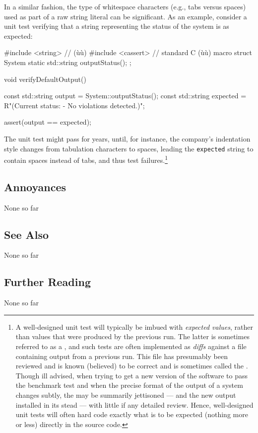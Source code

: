 In a similar fashion, the type of whitespace characters (e.g., tabs
versus spaces) used as part of a raw string literal can be significant.
As an example, consider a unit test verifying that a string representing
the status of the system is as expected:

\begin{emcppshiddenlisting}[emcppsbatch=e5]
#include <string>   // (ù{}ù)
#include <cassert>  // standard C (ù{}ù) macro
struct System
{
    static std::string outputStatus();
};
\end{emcppshiddenlisting}
\begin{emcppslisting}[emcppsbatch=e5]
void verifyDefaultOutput()
{
    const std::string output = System::outputStatus();
    const std::string expected = R"(Current status:
    - No violations detected.)";

    assert(output == expected);
}
\end{emcppslisting}
    
\noindent The unit test might pass for years, until, for instance, the
company's indentation style changes from tabulation characters to
spaces, leading the \lstinline!expected! string to contain spaces instead of tabs, and thus test failures.{\cprotect\footnote{A
well-designed unit test will typically be imbued with \emph{expected
values}, rather than values that were produced by the previous run.
The latter is sometimes referred to as a , and such tests are often implemented as \emph{diffs} against
a file containing output from a previous run. This file has
presumably been reviewed and is known (believed) to be correct and is sometimes called the . Though ill advised, when trying to get a new version of the software to pass the benchmark test and when the precise format of the output of a system
changes subtly, the  may be summarily jettisoned --- and the new
output installed in its stead --- with little if any detailed review.
Hence, well-designed unit tests will often hard code exactly what is
to be expected (nothing more or less) directly in the
   source code.}}

\subsection[Annoyances]{Annoyances}\label{annoyances}

None so far

\subsection[See Also]{See Also}\label{see-also}

None so far

\subsection[Further Reading]{Further Reading}\label{further-reading}

None so far


